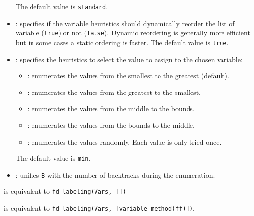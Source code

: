 \begin{itemize}
\begin{itemize}
\end{itemize}

The default value is \texttt{standard}.

\item {}: specifies if the variable
heuristics should dynamically reorder the list of variable (\texttt{true}) or
not (\texttt{false}). Dynamic reordering is generally more efficient but in
some cases a static ordering is faster. The default value is
\texttt{true}.

\item {}: specifies the heuristics
to select the value to assign to the chosen variable:

\begin{itemize}

\item {}: enumerates the values from the smallest to the greatest
(default).

\item {}: enumerates the values from the greatest to the smallest.

\item {}: enumerates the values from the middle to the bounds.

\item {}: enumerates the values from the bounds to the middle.

\item {}: enumerates the values randomly. Each value is only
tried once.

\end{itemize}

The default value is \texttt{min}.

\item {}: unifies \texttt{B} with the
number of backtracks during the enumeration.

\end{itemize}

 is equivalent to \texttt{fd\_labeling(Vars,
[])}.

 is equivalent to \texttt{fd\_labeling(Vars,
[variable\_method(ff)])}.

